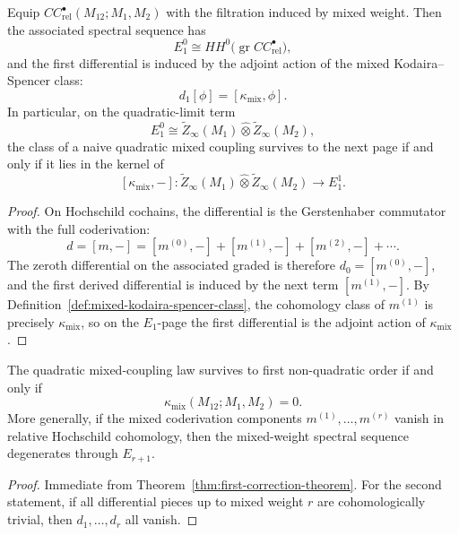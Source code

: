 \begin{theorem}
\label{thm:first-correction-theorem}
Equip $CC^\bullet_{\mathrm{rel}}(M_{12};M_1,M_2)$ with the filtration induced by mixed weight. Then the associated spectral sequence has
\[
E_1^0 \cong HH^0\bigl(\operatorname{gr} CC^\bullet_{\mathrm{rel}}\bigr),
\]
and the first differential is induced by the adjoint action of the mixed Kodaira--Spencer class:
\[
d_1[\phi] = [\kappa_{\mathrm{mix}},\phi].
\]
In particular, on the quadratic-limit term
\[
E_1^0 \cong \widetilde Z_\infty(M_1)\widehat\otimes \widetilde Z_\infty(M_2),
\]
the class of a naive quadratic mixed coupling survives to the next page if and only if it lies in the kernel of
\[
[\kappa_{\mathrm{mix}},-] :
\widetilde Z_\infty(M_1)\widehat\otimes \widetilde Z_\infty(M_2)
\longrightarrow E_1^1.
\]
\end{theorem}

\begin{proof}
On Hochschild cochains, the differential is the Gerstenhaber commutator with the full coderivation:
\[
d = [m,-] = [m^{(0)},-] + [m^{(1)},-] + [m^{(2)},-] + \cdots.
\]
The zeroth differential on the associated graded is therefore $d_0=[m^{(0)},-]$, and the first derived differential is induced by the next term $[m^{(1)},-]$. By Definition~\ref{def:mixed-kodaira-spencer-class}, the cohomology class of $m^{(1)}$ is precisely $\kappa_{\mathrm{mix}}$, so on the $E_1$-page the first differential is the adjoint action of $\kappa_{\mathrm{mix}}$.
\end{proof}

\begin{corollary}
\label{cor:persistence-criterion-quadratic-law}
The quadratic mixed-coupling law survives to first non-quadratic order if and only if
\[
\kappa_{\mathrm{mix}}(M_{12};M_1,M_2)=0.
\]
More generally, if the mixed coderivation components $m^{(1)},\dots,m^{(r)}$ vanish in relative Hochschild cohomology, then the mixed-weight spectral sequence degenerates through $E_{r+1}$.
\end{corollary}

\begin{proof}
Immediate from Theorem~\ref{thm:first-correction-theorem}. For the second statement, if all differential pieces up to mixed weight $r$ are cohomologically trivial, then $d_1,\dots,d_r$ all vanish.
\end{proof}

